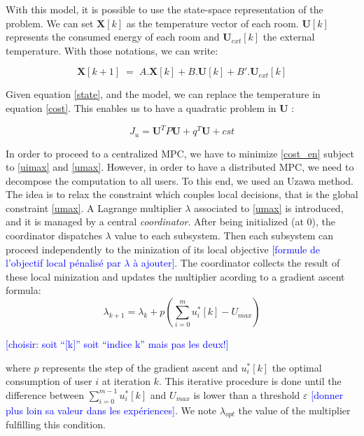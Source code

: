 \documentclass[conference]{IEEEtran}
\newcommand{\rem}[1]{\textcolor{blue}{[#1]}}
\begin{document}
With this model, it is possible to use the state-space representation of the problem. We can  set $\bm{X}[k]$ as the temperature vector of each room. $\bm{U}[k]$ represents the consumed energy of each room and $\bm{U}_{ext}[k]$ the external temperature. 
With those notations, we can write:

\begin{equation}
\bm{X}[k+1]\; = \; A . \bm{X}[k] + B .\bm{U}[k] + B'.\bm{U}_{ext}[k]
\label{state}
\end{equation}

Given equation \ref{state}, and the model, we can replace the temperature in equation \ref{cost}. This enables us to have a quadratic problem in $\bm{U}$ :

\begin{equation}
J_u = \bm{U}^T P \bm{U} + q^T \bm{U} + cst 
\label{cost_en}
\end{equation}

In order to proceed to a centralized MPC, we have to minimize \eqref{cost_en} subject to \eqref{uimax} and \eqref{umax}. However, in order to have a distributed MPC, we need to decompose the computation to all users. To this end, we used an Uzawa method. The idea is to relax the constraint which couples local decisions, that is the global constraint \eqref{umax}. A Lagrange multiplier $\lambda$ associated to \eqref{umax} is introduced, and it is managed by a central \emph{coordinator}. After being initialized (at 0), the coordinator dispatches $\lambda$ value to each subsystem. Then each subsystem can proceed independently to the minization of its local objective \rem{formule de l'objectif local pénalisé par $\lambda$ à ajouter}. The coordinator collects the result of these local minization and updates the multiplier acording to a gradient ascent formula:
\begin{equation}
\lambda_{k+1} = \lambda_k + p  \left(\sum_{i=0}^m u_i^*[k] - U_{max} \right)
\label{lambda}
\end{equation}

\rem{choisir: soit ``[k]'' soit ``indice k'' mais pas les deux!}

where $p$ represents the step of the gradient ascent and $u_i^*[k]$ the optimal consumption of user $i$ at iteration $k$. This iterative procedure is done until the difference between $\sum_{i=0}^{m-1} u_i^*[k]$ and  $U_{max}$ is lower than a threshold $\varepsilon$ \rem{donner plus loin sa valeur dans les expériences}. We note $\lambda_{opt}$ the value of the multiplier fulfilling this condition.
\end{document}
